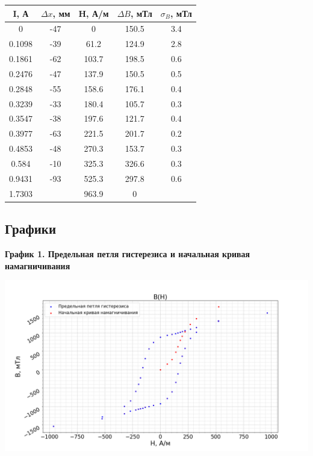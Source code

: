 \documentclass[14pt, a4paper,reqno]{article}
\begin{document}
    \newpage
    \begin{center}
        \begin{tabular}{|c|c|c|c|c|}
            \hline
            I, А    & $\Delta x$, мм & H, А/м   & $\Delta B$, мТл & $\sigma_B$, мТл \\ \hline\hline
            0       & -47            &  0       &  150.5          &  3.4    \\ \hline
            0.1098  & -39            &  61.2    &  124.9          &  2.8    \\ \hline
            0.1861  & -62            &  103.7   &  198.5          &  0.6    \\ \hline
            0.2476  & -47            &  137.9   &  150.5          &  0.5    \\ \hline
            0.2848  & -55            &  158.6   &  176.1          &  0.4    \\ \hline
            0.3239  & -33            &  180.4   &  105.7          &  0.3    \\ \hline
            0.3547  & -38            &  197.6   &  121.7          &  0.4    \\ \hline
            0.3977  & -63            &  221.5   &  201.7          &  0.2    \\ \hline
            0.4853  & -48            &  270.3   &  153.7          &  0.3    \\ \hline
            0.584   & -10            &  325.3   &  326.6          &  0.3    \\ \hline
            0.9431  & -93            &  525.3   &  297.8          &  0.6    \\ \hline
            1.7303  &                &  963.9   &  0              &         \\ \hline
        \end{tabular}
    \end{center}

    \newpage
    \subsection{Графики}

    \textbf{График 1. Предельная петля гистерезиса и начальная кривая намагничивания}
    \begin{center}
        \includegraphics[width = \textwidth]{images/graph.png}
    \end{center}
\end{document}
